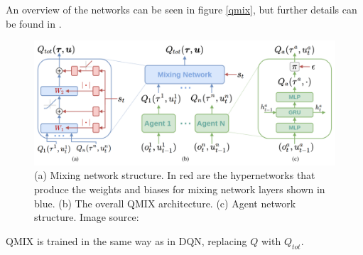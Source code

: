 An overview of the networks can be seen in figure \ref{qmix}, but further details can be found in \cite{qmix}.

\begin{figure}
    \centering
    \includegraphics[scale = 0.1]{images/qmix.png}
    \caption{(a) Mixing network structure. In red are the hypernetworks that produce the weights and biases for mixing network layers shown
in blue. (b) The overall QMIX architecture. (c) Agent network structure. Image source: \cite{qmix}}
    \label{fig:qmix}
\end{figure}





QMIX is trained in the same way as in DQN, replacing $Q$ with $Q_{tot}$.

